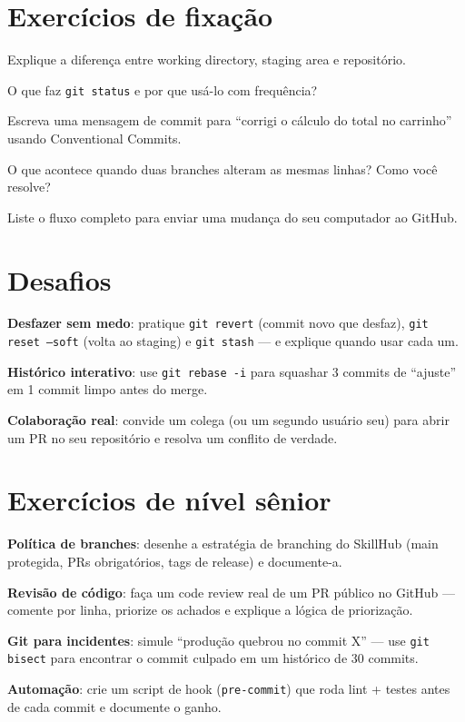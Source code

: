 \section{Exercícios de fixação}

\begin{exercicios}
  \item Explique a diferença entre working directory, staging area e repositório.
  \item O que faz \texttt{git status} e por que usá-lo com frequência?
  \item Escreva uma mensagem de commit para ``corrigi o cálculo do total no carrinho'' usando Conventional Commits.
  \item O que acontece quando duas branches alteram as mesmas linhas? Como você resolve?
  \item Liste o fluxo completo para enviar uma mudança do seu computador ao GitHub.
\end{exercicios}

\section{Desafios}

\begin{desafios}
  \item \textbf{Desfazer sem medo}: pratique \texttt{git revert} (commit novo que desfaz), \texttt{git reset --soft} (volta ao staging) e \texttt{git stash} — e explique quando usar cada um.
  \item \textbf{Histórico interativo}: use \texttt{git rebase -i} para squashar 3 commits de ``ajuste'' em 1 commit limpo antes do merge.
  \item \textbf{Colaboração real}: convide um colega (ou um segundo usuário seu) para abrir um PR no seu repositório e resolva um conflito de verdade.
\end{desafios}

\section{Exercícios de nível sênior}

\begin{seniores}
  \item \textbf{Política de branches}: desenhe a estratégia de branching do SkillHub (main protegida, PRs obrigatórios, tags de release) e documente-a.
  \item \textbf{Revisão de código}: faça um code review real de um PR público no GitHub — comente por linha, priorize os achados e explique a lógica de priorização.
  \item \textbf{Git para incidentes}: simule ``produção quebrou no commit X'' — use \texttt{git bisect} para encontrar o commit culpado em um histórico de 30 commits.
  \item \textbf{Automação}: crie um script de hook (\texttt{pre-commit}) que roda lint + testes antes de cada commit e documente o ganho.
\end{seniores}

